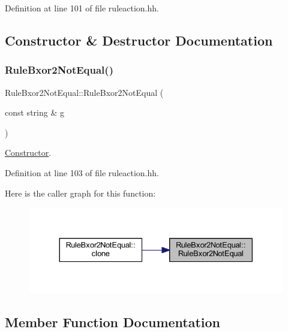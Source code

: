 Definition at line 101 of file ruleaction.\+hh.



\subsection{Constructor \& Destructor Documentation}
\mbox{\label{class_rule_bxor2_not_equal_a3a8c26bba2e5ad41d33c4737e8b7089b}} 
\subsubsection{\texorpdfstring{RuleBxor2NotEqual()}{RuleBxor2NotEqual()}}
{\footnotesize\ttfamily Rule\+Bxor2\+Not\+Equal\+::\+Rule\+Bxor2\+Not\+Equal (\begin{DoxyParamCaption}\item[{const string \&}]{g }\end{DoxyParamCaption})\hspace{0.3cm}{\ttfamily [inline]}}



\mbox{\hyperlink{class_constructor}{Constructor}}. 



Definition at line 103 of file ruleaction.\+hh.

Here is the caller graph for this function\+:
\nopagebreak
\begin{figure}[H]
\begin{center}
\leavevmode
\includegraphics[width=330pt]{class_rule_bxor2_not_equal_a3a8c26bba2e5ad41d33c4737e8b7089b_icgraph}
\end{center}
\end{figure}


\subsection{Member Function Documentation}
\mbox{\label{class_rule_bxor2_not_equal_a82882cbb68487e82f99e41b6753ca21b}} 
